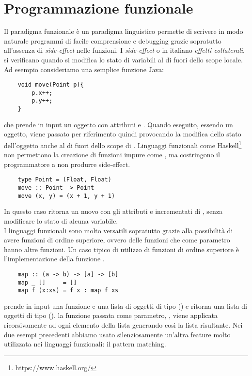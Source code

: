 \section{Programmazione funzionale}
Il paradigma funzionale è un paradigma linguistico permette di scrivere in modo naturale programmi di facile comprensione e debugging grazie sopratutto all'assenza di \emph{side-effect} nelle funzioni.
I \emph{side-effect} o in italiano \emph{effetti collaterali}, si verificano quando si modifica lo stato di variabili al di fuori dello scope locale. Ad esempio consideriamo una semplice funzione Java:
\begin{verbatim}
	void move(Point p){
		p.x++;
		p.y++;
	}
\end{verbatim} 
che prende in input un oggetto  con attributi  e . Quando eseguito, essendo  un oggetto, viene passato per riferimento
quindi provocando la modifica dello stato dell'oggetto anche al di fuori dello scope di . Linguaggi funzionali come Haskell\footnote{https://www.haskell.org/} non
permettono la creazione di funzioni impure come , ma costringono il programmatore a non produrre side-effect.
\begin{verbatim}
	type Point = (Float, Float)
	move :: Point -> Point
	move (x, y) = (x + 1, y + 1)
\end{verbatim}
In questo caso  ritorna un nuovo  con gli attributi  e  incrementati di , senza modificare lo stato di alcuna
variabile.
\\I linguaggi funzionali sono molto versatili sopratutto grazie alla possibilità di avere funzioni di ordine superiore, ovvero delle funzioni che come parametro
hanno altre funzioni. Un caso tipico di utilizzo di funzioni di ordine superiore è l'implementazione della funzione .
\begin{verbatim}
	map :: (a -> b) -> [a] -> [b]
	map _ []     = []
	map f (x:xs) = f x : map f xs
\end{verbatim}
 prende in input una funzione  e una lista di oggetti di tipo  (\code{[a]}) e ritorna una lista di oggetti di tipo  (\code{[b]}). 
la funzione passata come parametro, , viene applicata ricorsivamente ad ogni elemento della lista  generando così la lista risultante. 
Nei due esempi precedenti abbiamo usato silenziosamente un'altra feature molto utilizzata nei linguaggi funzionali: il pattern matching.
